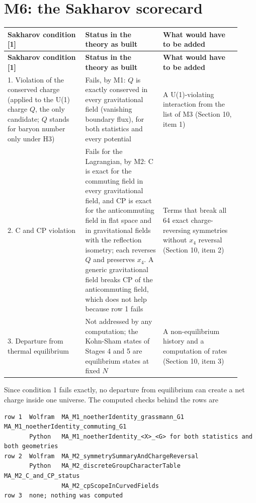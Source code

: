\documentclass[11pt]{article}
\begin{document}
\section{M6: the Sakharov scorecard}

\begin{longtable}{@{}p{0.307\linewidth}p{0.307\linewidth}p{0.307\linewidth}@{}}
\toprule
\textbf{Sakharov condition [1]} & \textbf{Status in the theory as built} & \textbf{What would have to be added} \\
\midrule
\endfirsthead
\toprule
\textbf{Sakharov condition [1]} & \textbf{Status in the theory as built} & \textbf{What would have to be added} \\
\midrule
\endhead
1. Violation of the conserved charge (applied to the U(1) charge $Q$, the only candidate; $Q$ stands for baryon number only under H3) & Fails, by M1: $Q$ is exactly conserved in every gravitational field (vanishing boundary flux), for both statistics and every potential & A U(1)-violating interaction from the list of M3 (Section 10, item 1) \\
2. C and CP violation & Fails for the Lagrangian, by M2: C is exact for the commuting field in every gravitational field, and CP is exact for the anticommuting field in flat space and in gravitational fields with the reflection isometry; each reverses $Q$ and preserves $x_4$. A generic gravitational field breaks CP of the anticommuting field, which does not help because row 1 fails & Terms that break all 64 exact charge-reversing symmetries without $x_4$ reversal (Section 10, item 2) \\
3. Departure from thermal equilibrium & Not addressed by any computation; the Kohn-Sham states of Stages 4 and 5 are equilibrium states at fixed $N$ & A non-equilibrium history and a computation of rates (Section 10, item 3) \\
\bottomrule
\end{longtable}

Since condition 1 fails exactly, no departure from equilibrium can create a net charge inside one universe. The computed checks behind the rows are

\begin{Verbatim}[fontsize=\small]
row 1  Wolfram  MA_M1_noetherIdentity_grassmann_G1  MA_M1_noetherIdentity_commuting_G1
       Python   MA_M1_noetherIdentity_<X>_<G> for both statistics and both geometries
row 2  Wolfram  MA_M2_symmetrySummaryAndChargeReversal
       Python   MA_M2_discreteGroupCharacterTable  MA_M2_C_and_CP_status
                MA_M2_cpScopeInCurvedFields
row 3  none; nothing was computed
\end{Verbatim}
\end{document}

